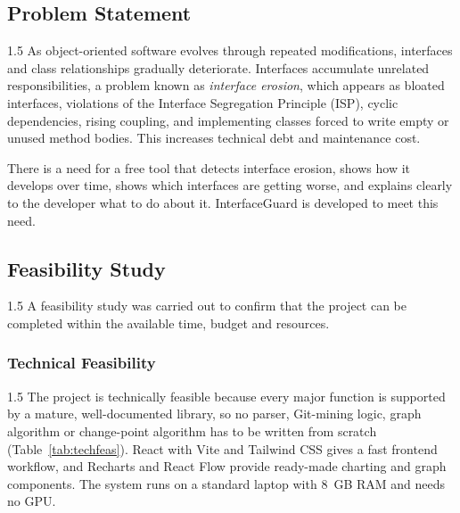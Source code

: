 \documentclass[12pt,a4paper]{article}
\begin{document}
\subsection{Problem Statement}

\begin{spacing}{1.5}
\justifying
As object-oriented software evolves through repeated modifications,
interfaces and class relationships gradually deteriorate. Interfaces
accumulate unrelated responsibilities, a problem known as
\emph{interface erosion}, which appears as bloated interfaces, violations
of the Interface Segregation Principle (ISP), cyclic dependencies, rising
coupling, and implementing classes forced to write empty or unused method
bodies. This increases technical debt and maintenance cost.

There is a need for a free tool that detects interface erosion, shows how
it develops over time, shows which interfaces are getting worse, and
explains clearly to the developer what to do about it. InterfaceGuard is
developed to meet this need.
\end{spacing}

\subsection{Feasibility Study}

\begin{spacing}{1.5}
\justifying
A feasibility study was carried out to confirm that the project can be
completed within the available time, budget and resources.
\end{spacing}

\subsubsection{Technical Feasibility}

\begin{spacing}{1.5}
\justifying
The project is technically feasible because every major function is
supported by a mature, well-documented library, so no parser, Git-mining
logic, graph algorithm or change-point algorithm has to be written from
scratch (Table~\ref{tab:techfeas}). React with Vite and Tailwind CSS gives
a fast frontend workflow, and Recharts and React Flow provide ready-made
charting and graph components. The system runs on a standard laptop with
8~GB RAM and needs no GPU.
\end{spacing}
\end{document}
